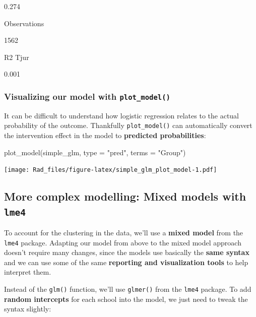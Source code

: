 \documentclass[
]{book}
\newenvironment{Shaded}{\begin{snugshade}}{\end{snugshade}}
\newcommand{\AttributeTok}[1]{\textcolor[rgb]{0.77,0.63,0.00}{#1}}
\newcommand{\FunctionTok}[1]{\textcolor[rgb]{0.00,0.00,0.00}{#1}}
\newcommand{\NormalTok}[1]{#1}
\newcommand{\StringTok}[1]{\textcolor[rgb]{0.31,0.60,0.02}{#1}}
\begin{document}
0.274

Observations

1562

R2 Tjur

0.001

\hypertarget{visualizing-our-model-with-plot_model}{%
\subsubsection*{\texorpdfstring{Visualizing our model with \texttt{plot\_model()}}{Visualizing our model with plot\_model()}}\label{visualizing-our-model-with-plot_model}}

It can be difficult to understand how logistic
regression relates to the actual probability
of the outcome. Thankfully \texttt{plot\_model()} can
automatically convert the intervention
effect in the model to \textbf{predicted probabilities}:

\begin{Shaded}
\begin{Highlighting}[]
\FunctionTok{plot\_model}\NormalTok{(simple\_glm,}
           \AttributeTok{type =} \StringTok{"pred"}\NormalTok{,}
           \AttributeTok{terms =} \StringTok{"Group"}\NormalTok{)}
\end{Highlighting}
\end{Shaded}

\texttt{[image: Rad\_files/figure-latex/simple\_glm\_plot\_model-1.pdf]}

\hypertarget{more-complex-modelling-mixed-models-with-lme4}{%
\subsection{\texorpdfstring{More complex modelling: Mixed models with \texttt{lme4}}{More complex modelling: Mixed models with lme4}}\label{more-complex-modelling-mixed-models-with-lme4}}

To account for the clustering in the data,
we'll use a \textbf{mixed model} from the \texttt{lme4}
package. Adapting our model from above to
the mixed model approach doesn't require
many changes, since the models use basically
the \textbf{same syntax} and we can use some
of the same \textbf{reporting and visualization
tools} to help interpret them.

Instead of the \texttt{glm()} function, we'll use \texttt{glmer()}
from the \texttt{lme4} package. To add \textbf{random intercepts}
for each school into the model, we just need to tweak
the syntax slightly:
\end{document}
